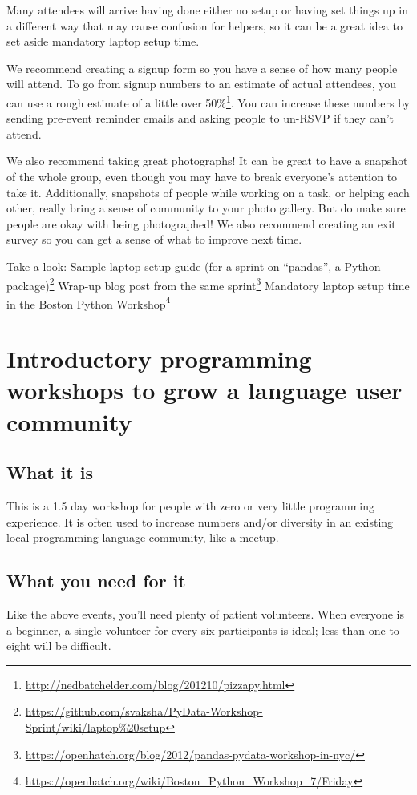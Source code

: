 Many attendees will arrive having done either no setup or having set things up in a different way that may cause confusion for helpers, so it can be a great idea to set aside mandatory laptop setup time.

We recommend creating a signup form so you have a sense of how many people will attend. To go from signup numbers to an estimate of actual attendees, you can use a rough estimate of a little over 50\%\footnote{\url{http://nedbatchelder.com/blog/201210/pizzapy.html}}. You can increase these numbers by sending pre-event reminder emails and asking people to un-RSVP if they can’t attend.

We also recommend taking great photographs! It can be great to have a snapshot of the whole group, even though you may have to break everyone’s attention to take it. Additionally, snapshots of people while working on a task, or helping each other, really bring a sense of community to your photo gallery. But do make sure people are okay with being photographed! We also recommend creating an exit survey so you can get a sense of what to improve next time.

Take a look:
Sample laptop setup guide (for a sprint on “pandas”, a Python package)\footnote{\url{https://github.com/svaksha/PyData-Workshop-Sprint/wiki/laptop\%20setup}}
Wrap-up blog post from the same sprint\footnote{\url{https://openhatch.org/blog/2012/pandas-pydata-workshop-in-nyc/}}
Mandatory laptop setup time in the Boston Python Workshop\footnote{\url{https://openhatch.org/wiki/Boston_Python_Workshop_7/Friday}}

\section{Introductory programming workshops to grow a language user community}
\subsection{What it is}
This is a 1.5 day workshop for people with zero or very little programming experience. It is often used to increase numbers and/or diversity in an existing local programming language community, like a meetup. 

\subsection{What you need for it}
Like the above events, you’ll need plenty of patient volunteers. When everyone is a beginner, a single volunteer for every six participants is ideal; less than one to eight will be difficult. 

